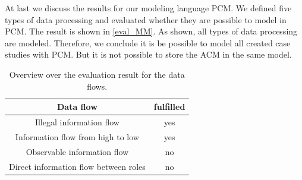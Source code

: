 At last we discuss the results for our modeling language PCM. We defined five types of data processing and evaluated whether they are possible to model in PCM. The result is shown in \autoref{eval_MM}. As shown, all types of data processing are modeled. Therefore, we conclude it is be possible to model all created case studies with PCM. But it is not possible to store the ACM in the same model. 

\begin{table}
\begin{tabular}{|c|c|}
\hline 
Data flow & fulfilled \\ 
\hline 
Illegal information flow & yes \\ 
\hline 
Information flow from high to low & yes \\ 
\hline 
Observable information  flow & no \\ 
\hline 
Direct information flow between roles & no \\ 
\hline 
\end{tabular} 
\caption{Overview over the evaluation result for the data flows.}
\label{eval_DF}
\end{table}
 
